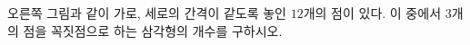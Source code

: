 \hspace*{2mm}\begin{minipage}[t]{\dimexpr\linewidth-2mm\relax}\vspace{0pt}
\noindent\begin{minipage}[t]{0.58\linewidth}\vspace{0pt}\raggedright 오른쪽 그림과 같이 가로, 세로의 간격이 같도록 놓인 $12$개의 점이 있다. 이 중에서 $3$개의 점을 꼭짓점으로 하는 삼각형의 개수를 구하시오. \end{minipage}\hfill\begin{minipage}[t]{0.4\linewidth}\vspace{0pt}\centering \resizebox{\ifdim\width>\linewidth\linewidth\else\width\fi}{!}{}\end{minipage}\par\end{minipage}
